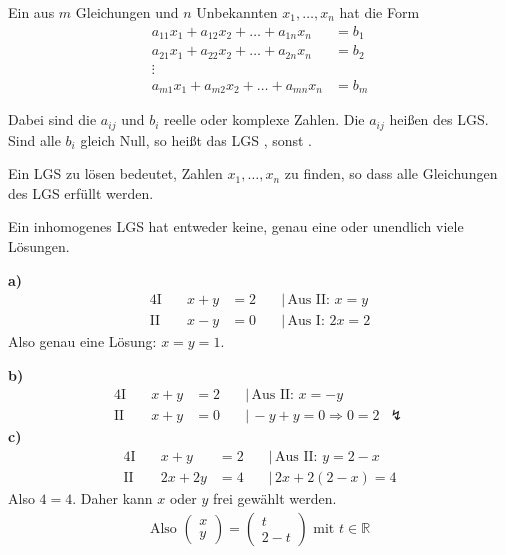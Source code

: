 Ein  aus $m$ Gleichungen und $n$ Unbekannten $x_1,\dots,x_n$ hat die Form
\begin{align*}
    a_{11}x_1 + a_{12}x_2 + \dots + a_{1n}x_n &= b_1 \\
    a_{21}x_1 + a_{22}x_2 + \dots + a_{2n}x_n &= b_2 \\
    \vdots & \\
    a_{m1}x_1 + a_{m2}x_2 + \dots + a_{mn}x_n &= b_m
\end{align*}

Dabei sind die $a_{ij}$ und $b_i$ reelle oder komplexe Zahlen. Die $a_{ij}$ heißen  des LGS. Sind alle $b_i$ gleich Null, so heißt das LGS , sonst .

Ein LGS zu lösen bedeutet, Zahlen $x_1,\dots,x_n$ zu finden, so dass alle Gleichungen des LGS erfüllt werden.

Ein inhomogenes LGS hat entweder keine, genau eine oder unendlich viele Lösungen.


\textbf{a)}
\begin{alignat*}{4}
\text{I}\quad & x+y & = 2 & \quad|\,\text{Aus II: } x = y \\
\text{II}\quad & x-y & = 0 & \quad|\,\text{Aus I: } 2x = 2
\end{alignat*}
Also genau eine Lösung: $x = y = 1$.

\textbf{b)}
\begin{alignat*}{4}
\text{I}\quad & x+y & = 2 & \quad|\,\text{Aus II: } x = -y \\
\text{II}\quad & x+y & = 0 & \quad|\,-y+y = 0 \Rightarrow 0 = 2 \enspace\lightning
\end{alignat*}
\textbf{c)}
\begin{alignat*}{4}
\text{I}\quad & x+y & = 2 & \quad|\,\text{Aus II: } y = 2 - x \\
\text{II}\quad & 2x + 2y & = 4 & \quad|\,2x + 2(2-x) = 4
\end{alignat*}
Also $4 = 4$. Daher kann $x$ oder $y$ frei gewählt werden.
\begin{align*}
    \text{Also }\begin{pmatrix}x\\y\end{pmatrix} = \begin{pmatrix}t\\2-t\end{pmatrix}\text{ mit }t\in \mathbb{R}
\end{align*}

